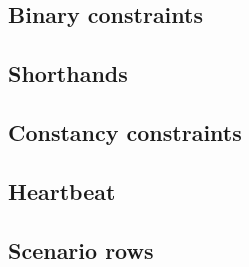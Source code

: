 \subsection{Binary constraints}    \label{mxp: constraints: binary}         
\subsection{Shorthands}            \label{mxp: constraints: shorthands}     
\subsection{Constancy constraints} \label{mxp: constraints: constancies}    
\subsection{Heartbeat}             \label{mxp: constraints: heartbeat}      
\subsection{Scenario rows}         \label{mxp: constraints: scenario rows}  
